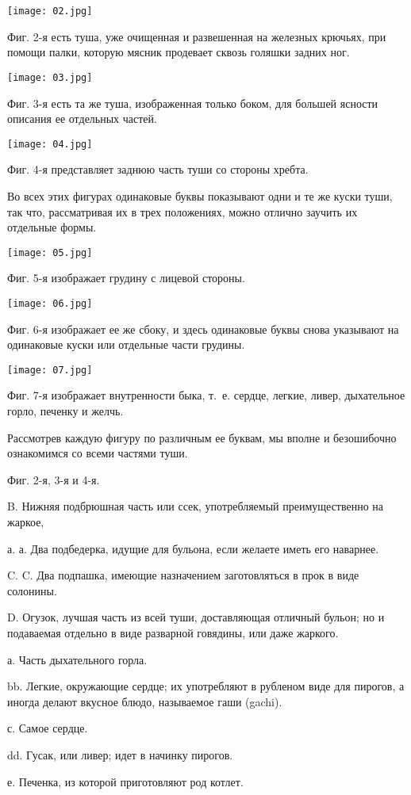 \texttt{[image: 02.jpg]}

Фиг. 2-я есть туша, уже очищенная и развешенная на железных крючьях, при помощи палки, которую мясник продевает сквозь голяшки задних ног.

\texttt{[image: 03.jpg]}

Фиг. 3-я есть та же туша, изображенная только боком, для большей ясности описания ее отдельных частей.

\texttt{[image: 04.jpg]}

Фиг. 4-я представляет заднюю часть туши со стороны хребта.

Во всех этих фигурах одинаковые буквы показывают одни и те же куски туши, так что, рассматривая их в трех положениях, можно отлично заучить их отдельные формы.

\texttt{[image: 05.jpg]}

Фиг. 5-я изображает грудину с лицевой стороны.

\texttt{[image: 06.jpg]}

Фиг. 6-я изображает ее же сбоку, и здесь одинаковые буквы снова указывают на одинаковые куски или отдельные части грудины.

\texttt{[image: 07.jpg]}

Фиг. 7-я изображает внутренности быка, т.~е. сердце, легкие, ливер, дыхательное горло, печенку и желчь.

Рассмотрев каждую фигуру по различным ее буквам, мы вполне и безошибочно ознакомимся со всеми частями туши.

Фиг. 2-я, 3-я и 4-я.

B. Нижняя подбрюшная часть или ссек, употребляемый преимущественно на жаркое,

а. а. Два подбедерка, идущие для бульона, если желаете иметь его наварнее.

C. C. Два подпашка, имеющие назначением заготовляться в прок в виде солонины.

D. Огузок, лучшая часть из всей туши, доставляющая отличный бульон; но и подаваемая отдельно в виде разварной говядины, или даже жаркого.

а. Часть дыхательного горла.

bb. Легкие, окружающие сердце; их употребляют в рубленом виде для пирогов, а иногда делают вкусное блюдо, называемое гаши (gachi).

с. Самое сердце.

dd. Гусак, или ливер; идет в начинку пирогов.

е. Печенка, из которой приготовляют род котлет.

